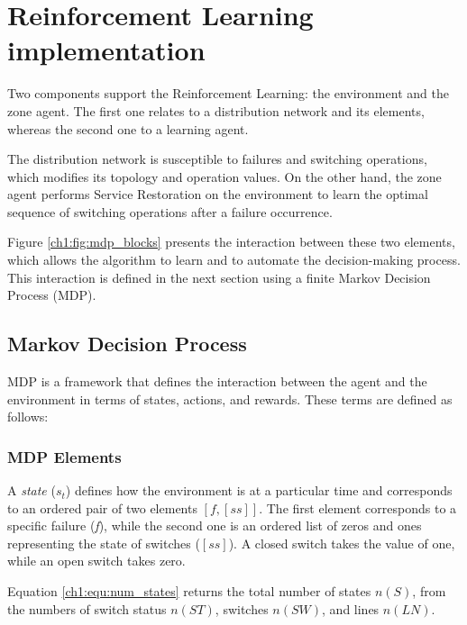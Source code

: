 \section{Reinforcement Learning implementation}
\label{ch1:sec:reinforcement}

Two components support the Reinforcement Learning: the environment and the zone agent. 
The first one relates to a distribution network and its elements, whereas the second 
one to a learning agent.

The distribution network is susceptible to failures and switching operations, which modifies 
its topology and operation values. 
On the other hand, the zone agent performs Service Restoration on the environment to learn 
the optimal sequence of switching operations after a failure occurrence. 

Figure \ref{ch1:fig:mdp_blocks} presents the interaction between these two elements, which 
allows the algorithm to learn and to automate the decision-making process. This interaction 
is defined in the next section using a finite Markov Decision Process (MDP).



\subsection{Markov Decision Process}

MDP is a framework that defines the interaction between the agent and the environment in terms of states,
actions, and rewards. These terms are defined as follows:


\subsubsection{MDP Elements}

A \textit{state} ($s_t$) defines how the environment is at a particular time and corresponds to an
ordered pair of two elements $[f, [ss]]$. The first element corresponds to a specific failure 
(\textit{f}), while the second one is an ordered list of zeros and ones representing the state of 
switches ($[ss]$). A closed switch takes the value of one, while an open switch takes zero.

Equation \ref{ch1:equ:num_states} returns the total number of states $n(S)$, from the numbers of switch 
status $n(ST)$, switches $n(SW)$, and lines $n(LN)$. 




